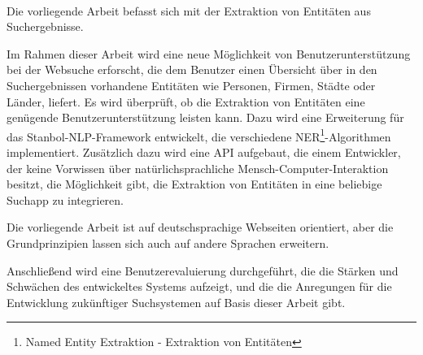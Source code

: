 \paragraph{}
Die vorliegende Arbeit befasst sich mit der Extraktion von Entitäten aus Suchergebnisse.

Im Rahmen dieser Arbeit wird eine neue Möglichkeit von Benutzerunterstützung bei der Websuche erforscht, die dem Benutzer einen Übersicht über in den Suchergebnissen vorhandene Entitäten wie Personen, Firmen, Städte oder Länder, liefert. Es wird überprüft, ob die Extraktion von Entitäten eine genügende Benutzerunterstützung leisten kann. Dazu wird eine Erweiterung für das Stanbol-NLP-Framework entwickelt, die verschiedene NER\footnote{Named Entity Extraktion - Extraktion von Entitäten}-Algorithmen implementiert. Zusätzlich dazu wird eine API aufgebaut, die einem Entwickler, der keine Vorwissen über natürlichsprachliche Mensch-Computer-Interaktion besitzt, die Möglichkeit gibt, die Extraktion von Entitäten in eine beliebige Suchapp zu integrieren. 

Die vorliegende Arbeit ist auf deutschsprachige Webseiten orientiert, aber die Grundprinzipien lassen sich auch auf andere Sprachen erweitern.

Anschließend wird eine Benutzerevaluierung durchgeführt, die die Stärken und Schwächen des entwickeltes Systems aufzeigt, und die die Anregungen für die Entwicklung zukünftiger Suchsystemen auf Basis dieser Arbeit gibt.